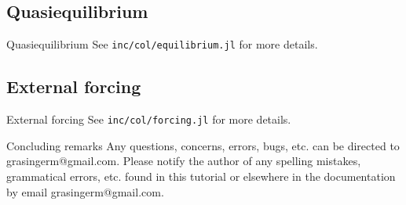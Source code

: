 \documentclass[pdf]{beamer}
\begin{document}
\subsection{Quasiequilibrium}

\begin{frame}{Quasiequilibrium}
  See \texttt{inc/col/equilibrium.jl} for more details.
\end{frame}

\subsection{External forcing}

\begin{frame}{External forcing}
  See \texttt{inc/col/forcing.jl} for more details.
\end{frame}

\begin{frame}{Concluding remarks}
  Any questions, concerns, errors, bugs, etc. can be directed to grasingerm@gmail.com.
  Please notify the author of any spelling mistakes, grammatical errors, etc. found in this tutorial or elsewhere in the documentation by email grasingerm@gmail.com.
\end{frame}
\end{document}
